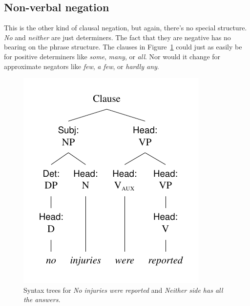 \subsection{Non-verbal negation}

This is the other kind of clausal negation, but again, there's no special structure. \textit{No} and \textit{neither} are just determiners. The fact that they are negative has no bearing on the phrase structure. The clauses in Figure~\ref{tree:noinjuries} could just as easily be for positive determiners like \textit{some}, \textit{many}, or \textit{all}. Nor would it change for approximate negators like \textit{few}, \textit{a few}, or \textit{hardly any}.

\begin{figure}
    \begin{multicols}{2}
    \centering
    \includegraphics[width=\linewidth]{figures/noinjuries.pdf}
    \caption{Syntax trees for \textit{No injuries were reported} and \textit{Neither side has all the answers.}}
    \label{tree:noinjuries}


\end{multicols}
\end{figure}
